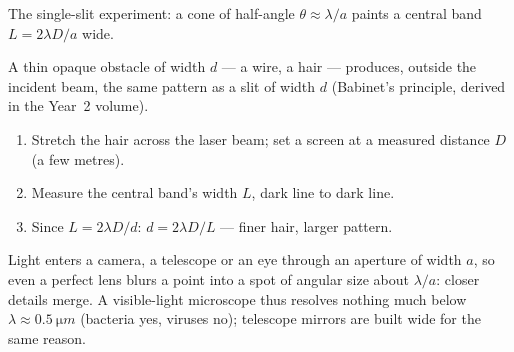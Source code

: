 \begin{omfigure}

{\small The single-slit experiment: a cone of half-angle $\theta
\approx \lambda/a$ paints a central band $L = 2\lambda D/a$ wide.}
\end{omfigure}

\begin{proposition}\label{prop:g12:light-as-wave:hair}
A thin opaque obstacle of width $d$ --- a wire, a hair --- produces,
outside the incident beam, the same pattern as a slit of width $d$
(Babinet's principle, derived in the Year~2 volume).
\end{proposition}
\admitted

\begin{method}\label{met:g12:light-as-wave:hairwidth}
\begin{enumerate}
  \item Stretch the hair across the laser beam; set a screen at a
        measured distance $D$ (a few metres).
  \item Measure the central band's width $L$, dark line to dark line.
  \item Since $L = 2\lambda D/d$: $d = 2\lambda D/L$ --- finer hair,
        larger pattern.
\end{enumerate}
\end{method}

\begin{remark}\label{rem:g12:light-as-wave:limits}
Light enters a camera, a telescope or an eye through an aperture of
width $a$, so even a perfect lens blurs a point into a spot of
angular size about $\lambda/a$: closer details merge. A visible-light
microscope thus resolves nothing much below $\lambda \approx
\qty{0.5}{\micro m}$ (bacteria yes, viruses no); telescope mirrors
are built wide for the same reason.
\end{remark}

